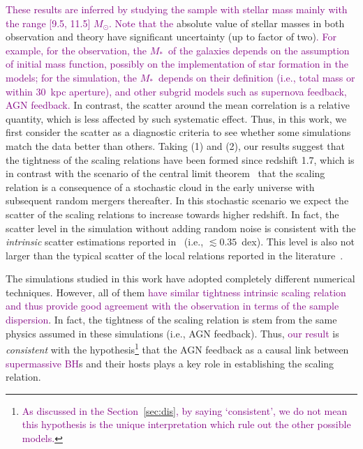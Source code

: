 \documentclass[twocolumn]{aastex631}
\newcommand{\todo}[1]{\textcolor{red}{[{\bf TODO}: #1]}}
\newcommand{\red}[1]{\textcolor{purple}{#1}}
\def\smass{{$M_*$}}
\begin{document}
\red{These results are inferred by studying the sample with stellar mass mainly with the range [9.5, 11.5] $M_{\odot}$. Note that
the} absolute value of stellar masses in both observation and theory have significant uncertainty (up to factor of two)\red{. For example, for the observation, the \smass\ of the galaxies depends on the assumption of initial mass function, possibly on the implementation of star formation in the models; for the simulation, the \smass\ depends on their definition (i.e., total mass or within 30~kpc aperture), and other subgrid models such as supernova feedback, AGN feedback.} In contrast, the scatter around the mean correlation is a relative quantity, which is less affected by such systematic effect. Thus, in this work, we first consider the scatter as a diagnostic criteria to see whether some simulations match the data better than others. Taking (1) and (2), our results suggest that the tightness of the scaling relations have been formed since redshift 1.7, which is in contrast with the scenario of the central limit theorem~\citep{Peng2007, Jahnke2011, Hirschmann2010} that the scaling relation is a consequence of a stochastic cloud in the early universe with subsequent random mergers thereafter. In this stochastic scenario we expect the scatter of the scaling relations to increase towards higher redshift. In fact, the scatter level in the simulation without adding random noise is consistent with the {\it intrinsic} scatter estimations reported in~\citet{Ding2020, 2021arXiv210902751L} (i.e., $\lesssim0.35$~dex). This level is also not larger than the typical scatter of the local relations reported in the literature~\citep{Kormendy13, Gul++09, Reines2015}.

The simulations studied in this work have adopted completely different numerical techniques. However, all of them \red{have similar tightness intrinsic scaling relation and thus provide good agreement with the observation in terms of the sample dispersion}. In fact, the tightness of the scaling relation is stem from the same physics assumed in these simulations (i.e., AGN feedback). Thus, \red{our result} is {\it consistent} with the hypothesis\footnote{\red{As discussed in the Section~\ref{sec:dis}, by saying `consistent', we do not mean this hypothesis is the unique interpretation  which rule out the other possible models.}} that the AGN feedback as a causal link between \red{supermassive BH}s and their hosts plays a key role in establishing the scaling relation. 
\end{document}

